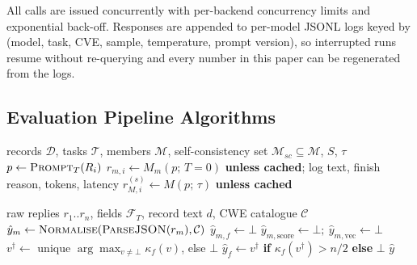 \documentclass[11pt]{article}
\begin{document}
All calls are issued concurrently with per-backend concurrency limits and exponential back-off. Responses are appended to per-model JSONL logs keyed by (model, task, CVE, sample, temperature, prompt version), so interrupted runs resume without re-querying and every number in this paper can be regenerated from the logs.

\subsection{Evaluation Pipeline Algorithms}

\begin{algorithm}[htbp]
\caption{Parallel fan-out (phase 1)}\label{alg:fanout}
\begin{algorithmic}[1]
\Require records $\mathcal{D}$, tasks $\mathcal{T}$, members $\mathcal{M}$, self-consistency set $\mathcal{M}_{sc}\subseteq\mathcal{M}$, $S$, $\tau$
  \State $p\gets\textsc{Prompt}_T(R_i)$ 
     \State $r_{m,i}\gets M_m(p;\,T{=}0)$ \textbf{unless cached}; log text, finish reason, tokens, latency
  \EndFor
     \State $r^{(s)}_{M,i}\gets M(p;\,\tau)$ \textbf{unless cached}
  \EndFor
\EndFor
\end{algorithmic}
\end{algorithm}

\begin{algorithm}[htbp]
\caption{Verified consensus for one record (phase 3)}\label{alg:vmaj}
\begin{algorithmic}[1]
\Require raw replies $r_1..r_n$, fields $\mathcal{F}_T$, record text $d$, CWE catalogue $\mathcal{C}$
  \State $\hat y_m\gets\textsc{Normalise}(\textsc{ParseJSON}(r_m),\mathcal{C})$ 
     $\hat y_{m,f}\gets\bot$ \EndIf
  \EndFor
   $\hat y_{m,\text{score}}\gets\bot;\ \hat y_{m,\text{vec}}\gets\bot$ \EndIf
\EndFor
{}
  \State $v^\dagger\gets$ unique $\arg\max_{v\neq\bot}\kappa_f(v)$, else $\bot$
  \State $\hat y_f\gets v^\dagger$ \textbf{if} $\kappa_f(v^\dagger)>n/2$ \textbf{else} $\bot$ 
\EndFor
\State \Return $\hat y$ 
\end{algorithmic}
\end{algorithm}
\end{document}
